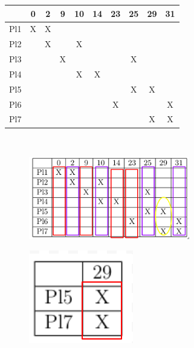 \documentclass[a4paper,12pt]{article}
\begin{document}
\begin{enumerate}[label=\textcolor{teal}{\textbf{\arabic*.}}]
            \begin{table}[H]
            \centering
            \begin{tabular}{|c|c|c|c|c|c|c|c|c|c|}
                \hline
                    & 0 & 2 & 9 & 10 & 14 & 23 & 25 & 29 & 31\\ 
                \hline
                Pl1 & X & X &  &  &  &  &  &  & \\ 
                \hline 
                Pl2 &  & X &  & X &  &  &  &  & \\ 
                \hline 
                Pl3 &  &  & X &  &  &  & X &  & \\
                \hline 
                Pl4 &  &  &  & X & X &  &  &  & \\ 
                \hline 
                Pl5 &  &  &  &  &  &  & X & X & \\ 
                \hline 
                Pl6 &  &  &  &  &  & X &  &  & X\\ 
                \hline 
                Pl7 &  &  &  &  &  &  &  & X & X\\ 
                \hline 
            \end{tabular}\\
        \end{table}
            
            \begin{figure}[H]
                \centering
                \includegraphics[width=7cm]{img/mapa11.1.png}
            \end{figure}

            \begin{figure}[H]
                \centering
                \includegraphics[width=5 cm]{img/mapa11.2.png}
            \end{figure}


\end{enumerate}
\end{document}
